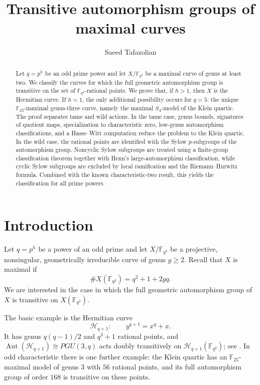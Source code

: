\documentclass[11pt]{amsart}
\title{Transitive automorphism groups of maximal curves}
\author{Saeed Tafazolian}
\theoremstyle{remark}
\newcommand{\F}{\mathbb F}
\newcommand{\Aut}{\operatorname{Aut}}
\newcommand{\cH}{\mathcal H}
\begin{document}
\begin{abstract}
Let $q=p^h$ be an odd prime power and let $X/\F_{q^2}$ be a maximal
curve of genus at least two. We classify the curves for which the full
geometric automorphism group is transitive on the set of
$\F_{q^2}$-rational points. We prove that, if $h>1$, then $X$ is the
Hermitian curve. If $h=1$, the only additional possibility occurs for
$q=5$: the unique $\F_{25}$-maximal genus-three curve, namely the
maximal $S_4$-model of the Klein quartic. The proof separates tame and
wild actions. In the tame case, genus bounds, signatures of quotient
maps, specialization to characteristic zero, low-genus automorphism
classifications, and a Hasse--Witt computation reduce the problem to
the Klein quartic. In the wild case, the rational points are identified
with the Sylow $p$-subgroups of the automorphism group. Noncyclic Sylow
subgroups are treated using a finite-group classification theorem
together with Henn's large-automorphism classification, while cyclic
Sylow subgroups are excluded by local ramification and the
Riemann--Hurwitz formula. Combined with the known characteristic-two
result, this yields the classification for all prime powers.
\end{abstract}

\maketitle

\section{Introduction}

Let $q=p^h$ be a power of an odd prime and let $X/\F_{q^2}$ be a
projective, nonsingular, geometrically irreducible curve of genus
$g\ge2$.  Recall that $X$ is maximal if
\[
        \#X(\F_{q^2})=q^2+1+2gq.
\]
We are interested in the case in which the full geometric automorphism
group of $X$ is transitive on $X(\F_{q^2})$.

The basic example is the Hermitian curve
\[
        \cH_{q+1}:\qquad y^{q+1}=x^q+x.
\]
It has genus $q(q-1)/2$ and $q^3+1$ rational points, and
$\Aut(\cH_{q+1})\cong PGU(3,q)$ acts doubly transitively on
$\cH_{q+1}(\F_{q^2})$; see \cite[Theorem~12.24(iv)]{HKT}.  In odd
characteristic there is one further example: the Klein quartic has an
$\F_{25}$-maximal model of genus $3$ with $56$ rational points, and its
full automorphism group of order $168$ is transitive on these points.
\end{document}
